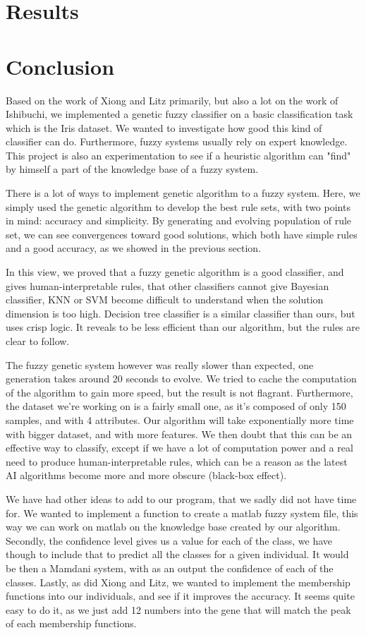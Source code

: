 \documentclass[a4paper,12pt]{article}
\begin{document}
\section{Results}


\section{Conclusion}

Based on the work of Xiong and Litz primarily, but also a lot on the work of Ishibuchi, we implemented a genetic fuzzy classifier on a basic classification task which is the Iris dataset.
We wanted to investigate how good this kind of classifier can do. Furthermore, fuzzy systems usually rely on expert knowledge. This project is also an experimentation to  see if a heuristic algorithm can "find" by himself a part of the knowledge base of a fuzzy system.

There is a lot of ways to implement genetic algorithm to a fuzzy system. Here, we simply used the genetic algorithm to develop the best rule sets, with two points in mind: accuracy and simplicity.
By generating and evolving population of rule set, we can see convergences toward good solutions, which both have simple rules and a good accuracy, as we showed in the previous section.

In this view, we proved that a fuzzy genetic algorithm is a good classifier, and gives human-interpretable rules, that other classifiers cannot give Bayesian classifier, KNN or SVM become difficult to understand when the solution dimension is too high.
Decision tree classifier is a similar classifier than ours, but uses crisp logic. It reveals to be less efficient than our algorithm, but the rules are clear to follow.

The fuzzy genetic system however was really slower than expected, one generation takes around 20 seconds to evolve. We tried to cache the computation of the algorithm to gain more speed, but the result is not flagrant. Furthermore, the dataset we're working on is a fairly small one, as it's composed of only 150 samples, and with 4 attributes. Our algorithm will take exponentially more time with bigger dataset, and with more features. We then doubt that this can be an effective way to classify, except if we have a lot of computation power and a real need to produce human-interpretable rules, which can be a reason as the latest AI algorithms become more and more obscure (black-box effect).

We have had other ideas to add to our program, that we sadly did not have time for.
We wanted to implement a function to create a matlab fuzzy system file, this way we can work on matlab on the knowledge base created by our algorithm.
Secondly, the confidence level gives us a value for each of the class, we have though to include that to predict all the classes for a given individual. It would be then a Mamdani system, with as an output the confidence of each of the classes.
Lastly, as did Xiong and Litz, we wanted to implement the membership functions into our individuals, and see if it improves the accuracy. It seems quite easy to do it, as we just add 12 numbers into the gene that will match the peak of each membership functions.

 


\nocite{*}
\end{document}
